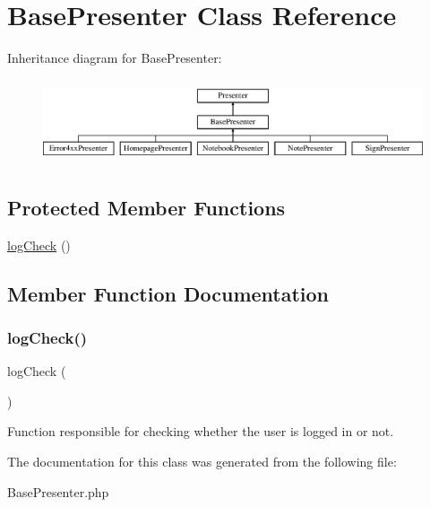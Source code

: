 \hypertarget{class_app_1_1_presenters_1_1_base_presenter}{}\section{Base\+Presenter Class Reference}
\label{class_app_1_1_presenters_1_1_base_presenter}
Inheritance diagram for Base\+Presenter\+:\begin{figure}[H]
\begin{center}
\leavevmode
\includegraphics[height=2.488889cm]{class_app_1_1_presenters_1_1_base_presenter}
\end{center}
\end{figure}
\subsection*{Protected Member Functions}
\begin{DoxyCompactItemize}
\item 
\mbox{\hyperlink{class_app_1_1_presenters_1_1_base_presenter_ac82bc6601e7d9ed8f142734573463465}{log\+Check}} ()
\end{DoxyCompactItemize}


\subsection{Member Function Documentation}
\mbox{\label{class_app_1_1_presenters_1_1_base_presenter_ac82bc6601e7d9ed8f142734573463465}} 
\subsubsection{\texorpdfstring{log\+Check()}{logCheck()}}
{\footnotesize\ttfamily log\+Check (\begin{DoxyParamCaption}{ }\end{DoxyParamCaption})\hspace{0.3cm}{\ttfamily [protected]}}

Function responsible for checking whether the user is logged in or not. 

The documentation for this class was generated from the following file\+:\begin{DoxyCompactItemize}
\item 
Base\+Presenter.\+php\end{DoxyCompactItemize}
